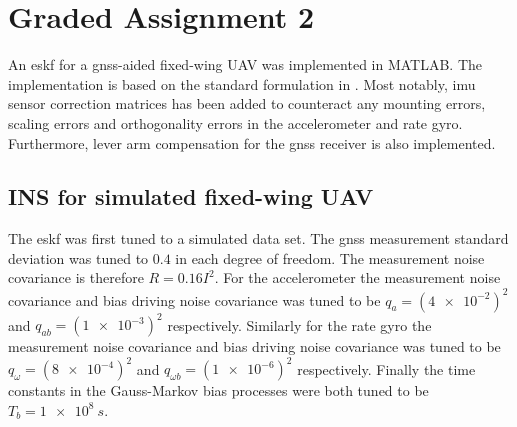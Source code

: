 \section{Graded Assignment 2}\label{sec:graded_assignment_2}


An \acrfull{eskf} for a \acrshort{gnss}-aided fixed-wing UAV was implemented in MATLAB. The implementation is based on the standard formulation in \cite{Sola}. Most notably, \acrshort{imu} sensor correction matrices has been added to counteract any mounting errors, scaling errors and orthogonality errors in the accelerometer and rate gyro. Furthermore, lever arm compensation for the \acrshort{gnss} receiver is also implemented.

\subsection{INS for simulated fixed-wing UAV}





The \acrshort{eskf} was first tuned to a simulated data set. The \acrshort{gnss} measurement standard deviation was tuned to $0.4$ in each degree of freedom. The measurement noise covariance is therefore $R=0.16 I ^2$. For the accelerometer the measurement noise covariance and bias driving noise covariance was tuned to be $q_{a} = (\SI{4e-2})^2$ and $ q_{ab} = (\SI{1e-3})^2$ respectively. Similarly for the rate gyro the measurement noise covariance and bias driving noise covariance was tuned to be $q_{\omega} = (\SI{8e-4})^2$ and $q_{\omega b} = (\SI{1e-6})^2$ respectively. Finally the time constants in the Gauss-Markov bias processes were both tuned to be $T_b = \SI{1e8}{s}$.

